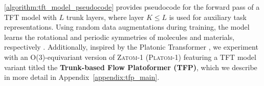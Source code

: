 \documentclass{article}
\theoremstyle{plain}
\theoremstyle{definition}
\theoremstyle{remark}
\begin{document}
\cref{algorithm:tft_model_pseudocode} provides pseudocode for the forward pass of a \textsc{TFT} model with $L$ trunk layers, where layer $K \le L$ is used for auxiliary task representations.
Using random data augmentations during training, the model learns the rotational and periodic symmetries of molecules and materials, respectively \citep{abramson2024accurate, joshi2025allatom}.
Additionally, inspired by the Platonic Transformer \citep{islam2025platonic}, we experiment with an O(3)-equivariant version of \textsc{Zatom-1} (\textsc{Platom-1}) featuring a \textsc{TFT} model variant titled the \textbf{Trunk-based Flow Platoformer (\textsc{TFP})},
which we describe in more detail in Appendix~\ref{appendix:tfp_main}.

\end{document}
